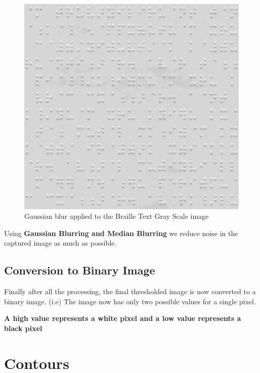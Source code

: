 \documentclass{article}
\begin{document}
\begin{figure}[!htb]
\caption{Gaussian blur applied to the Braille Text Gray Scale image}
\centering
\includegraphics[scale=0.4]{gaussian}
\end{figure}

Using \textbf{Gaussian Blurring and Median Blurring} we reduce noise in the captured image as much as possible.

\subsection{Conversion to Binary Image}

Finally after all the processing, the final thresholded image is now converted to a binary image. (i.e) The image now has only two possible values for a single pixel.

\textbf{A high value represents a white pixel and a low value represents a black pixel}

\section{Contours}
\end{document}
